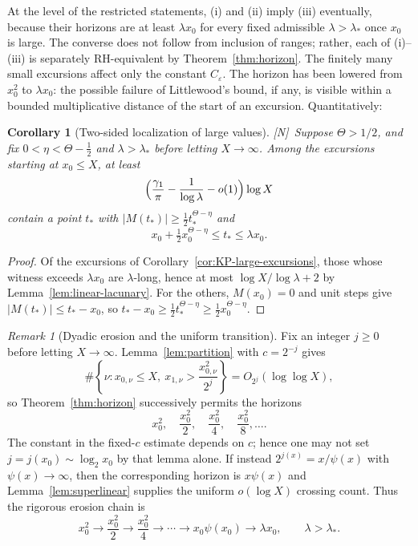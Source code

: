 \documentclass[11pt]{amsart}
\numberwithin{equation}{section}
\theoremstyle{plain}
\newtheorem{corollary}[theorem]{Corollary}
\theoremstyle{definition}
\theoremstyle{remark}
\newtheorem{remark}[theorem]{Remark}
\newcommand{\eps}{\varepsilon}
\newcommand{\tagN}{\textup{[N]}}
\begin{document}
At the level of the restricted statements, (i) and (ii) imply (iii)
eventually, because their horizons are at least $\lambda x_0$ for every
fixed admissible $\lambda>\lambda_*$ once $x_0$ is large.  The converse
does not follow from inclusion of ranges; rather, each of (i)--(iii) is
separately RH-equivalent by Theorem~\ref{thm:horizon}.  The finitely many
small excursions affect only the constant $C_\eps$. The horizon has
been lowered from $x_0^2$ to $\lambda x_0$: the possible failure of
Littlewood's bound, if any, is visible within a bounded multiplicative
distance of the start of an excursion. Quantitatively:

\begin{corollary}[Two-sided localization of large values]
\label{cor:two-sided}
\tagN\ Suppose $\Theta>1/2$, and fix $0<\eta<\Theta-\frac12$ and
$\lambda>\lambda_*$ before letting $X\to\infty$.
Among the excursions starting at $x_0\le X$, at least
\[
\Bigl(\frac{\gamma_1}{\pi}-\frac1{\log\lambda}-o(1)\Bigr)\log X
\]
contain a point $t_*$ with $|M(t_*)|\ge\frac12t_*^{\Theta-\eta}$ and
\[
x_0+\tfrac12x_0^{\Theta-\eta}\le t_*\le\lambda x_0 .
\]
\end{corollary}

\begin{proof}
Of the excursions of Corollary~\ref{cor:KP-large-excursions}, those whose
witness exceeds $\lambda x_0$ are $\lambda$-long, hence at most
$\log X/\log\lambda+2$ by Lemma~\ref{lem:linear-lacunary}. For the others,
$M(x_0)=0$ and unit steps give $|M(t_*)|\le t_*-x_0$, so
$t_*-x_0\ge\frac12t_*^{\Theta-\eta}\ge\frac12x_0^{\Theta-\eta}$.
\end{proof}


\begin{remark}[Dyadic erosion and the uniform transition]
\label{rem:dyadic-erosion}
Fix an integer $j\ge0$ before letting $X\to\infty$.  Lemma~\ref{lem:partition} with
$c=2^{-j}$ gives
\[
\#\left\{\nu:x_{0,\nu}\le X,\ x_{1,\nu}>
\frac{x_{0,\nu}^2}{2^j}\right\}=O_{2^j}(\log\log X),
\]
so Theorem~\ref{thm:horizon} successively permits the horizons
\[
x_0^2,\quad \frac{x_0^2}{2},\quad \frac{x_0^2}{4},\quad
\frac{x_0^2}{8},\ldots.
\]
The constant in the fixed-$c$ estimate depends on $c$; hence one may not set
$j=j(x_0)\sim\log_2x_0$ by that lemma alone.  If instead
$2^{j(x)}=x/\psi(x)$ with $\psi(x)\to\infty$, then the corresponding
horizon is $x\psi(x)$ and Lemma~\ref{lem:superlinear} supplies the uniform
$o(\log X)$ crossing count.  Thus the rigorous erosion chain is
\[
x_0^2\to\frac{x_0^2}{2}\to\frac{x_0^2}{4}\to\cdots
\to x_0\psi(x_0)\to\lambda x_0,\qquad\lambda>\lambda_*.
\]
\end{remark}
\end{document}

